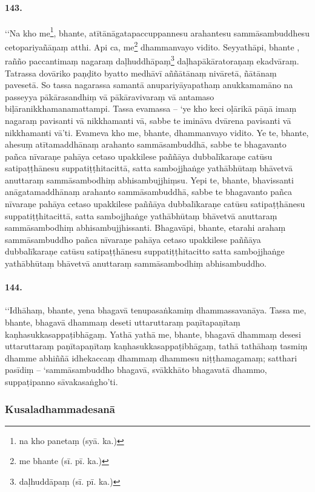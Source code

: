 \paragraph{143.} ‘‘Na kho me\footnote{na kho panetaṃ (syā. ka.)}, bhante, atītānāgatapaccuppannesu arahantesu sammāsambuddhesu cetopariyañāṇaṃ atthi. Api ca, me\footnote{me bhante (sī. pī. ka.)} dhammanvayo vidito. Seyyathāpi, bhante , rañño paccantimaṃ nagaraṃ daḷhuddhāpaṃ\footnote{daḷhuddāpaṃ (sī. pī. ka.)} daḷhapākāratoraṇaṃ ekadvāraṃ. Tatrassa dovāriko paṇḍito byatto medhāvī aññātānaṃ nivāretā, ñātānaṃ pavesetā. So tassa nagarassa samantā anupariyāyapathaṃ anukkamamāno na passeyya pākārasandhiṃ vā pākāravivaraṃ vā antamaso biḷāranikkhamanamattampi. Tassa evamassa – ‘ye kho keci oḷārikā pāṇā imaṃ nagaraṃ pavisanti vā nikkhamanti vā, sabbe te imināva dvārena pavisanti vā nikkhamanti vā’ti. Evameva kho me, bhante, dhammanvayo vidito. Ye te, bhante, ahesuṃ atītamaddhānaṃ arahanto sammāsambuddhā, sabbe te bhagavanto pañca nīvaraṇe pahāya cetaso upakkilese paññāya dubbalīkaraṇe catūsu satipaṭṭhānesu suppatiṭṭhitacittā, satta sambojjhaṅge yathābhūtaṃ bhāvetvā anuttaraṃ sammāsambodhiṃ abhisambujjhiṃsu. Yepi te, bhante, bhavissanti anāgatamaddhānaṃ arahanto sammāsambuddhā, sabbe te bhagavanto pañca nīvaraṇe pahāya cetaso upakkilese paññāya dubbalīkaraṇe catūsu satipaṭṭhānesu suppatiṭṭhitacittā, satta sambojjhaṅge yathābhūtaṃ bhāvetvā anuttaraṃ sammāsambodhiṃ abhisambujjhissanti. Bhagavāpi, bhante, etarahi arahaṃ sammāsambuddho pañca nīvaraṇe pahāya cetaso upakkilese paññāya dubbalīkaraṇe catūsu satipaṭṭhānesu suppatiṭṭhitacitto satta sambojjhaṅge yathābhūtaṃ bhāvetvā anuttaraṃ sammāsambodhiṃ abhisambuddho.

\paragraph{144.} ‘‘Idhāhaṃ, bhante, yena bhagavā tenupasaṅkamiṃ dhammassavanāya. Tassa me, bhante, bhagavā dhammaṃ deseti uttaruttaraṃ paṇītapaṇītaṃ kaṇhasukkasappaṭibhāgaṃ. Yathā yathā me, bhante, bhagavā dhammaṃ desesi uttaruttaraṃ paṇītapaṇītaṃ kaṇhasukkasappaṭibhāgaṃ, tathā tathāhaṃ tasmiṃ dhamme abhiññā idhekaccaṃ dhammaṃ dhammesu niṭṭhamagamaṃ; satthari pasīdiṃ – ‘sammāsambuddho bhagavā, svākkhāto bhagavatā dhammo, suppaṭipanno sāvakasaṅgho’ti.

\subsubsection{Kusaladhammadesanā}

